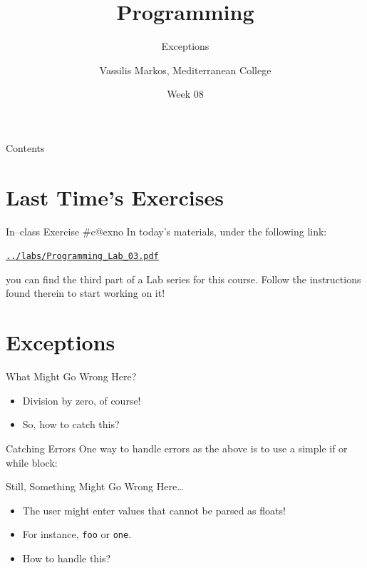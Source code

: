 \documentclass[aspectratio=169, 12pt, xcolor=table]{beamer}
\title{Programming}
\subtitle{Exceptions}
\date{Week 08}
\author{Vassilis Markos, Mediterranean College}
\makeatletter
\newcommand{\ohref}[1]{\href{#1}{\texttt{#1}}}
\newcommand{\arabicthree}[1]{\expandafter\@arabicthree\csname c@#1\endcsname}
\newcommand{\@arabicthree}[1]{\ifnum #1<100 0\fi\ifnum #1<10 0\fi\number#1}
\newcounter{exno}
\newcommand{\exno}{\stepcounter{exno}In--class Exercise \#\arabicthree{exno}}
\makeatother
\begin{document}
	\begin{frame}
		\titlepage
	\end{frame}

	\begin{frame}{Contents}
		\tableofcontents
	\end{frame}

	\section{Last Time's Exercises}\label{sec:last-time-s-exercises}
	
	\sectionframe
	
	\setcounter{exno}{0}
	
	\begin{frame}{\exno}		
		In today's materials, under the following link:
		\begin{center}
			\ohref{../labs/Programming\_Lab\_03.pdf}
		\end{center}
		you can find the third part of a Lab series for this course. Follow the instructions found therein to start working on it!
	\end{frame}

	\section{Exceptions}\label{sec:exceptions}
	
	\sectionframe
	
	
	\begin{frame}{What Might Go Wrong Here?}
		\pause
		\begin{itemize}
			\item Division by zero, of course!\pause
			\item So, how to catch this?
		\end{itemize}
	\end{frame}
	
	\begin{frame}{Catching Errors}
		One way to handle errors as the above is to use a simple if or while block:
		
	\end{frame}

	\begin{frame}{Still, Something Might Go Wrong Here\ldots}
		\pause
		\begin{itemize}
			\item The user might enter values that cannot be parsed as floats!\pause
			\item For instance, \texttt{foo} or \texttt{one}.\pause
			\item How to handle this?
		\end{itemize}
	\end{frame}
\end{document}
